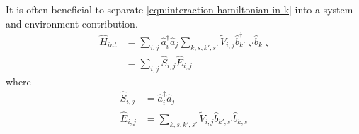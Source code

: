 It is often beneficial to separate
\cref{eqn:interaction hamiltonian in k}
into a system and environment contribution.
\begin{align}
  \hat{H}_{int} & =
  \sum_{i,j}
  \hat{a}^\dagger_{i}\hat{a}_{j}
  \sum_{k,s,k',s'}
  \tilde{V}_{i,j}
  \hat{b}^\dagger_{k',s'}\hat{b}_{k,s} \\
                & = \sum_{i,j}
  \hat{S}_{i,j} \hat{E}_{i,j}\label{eqn:split interaction hamiltonian}
\end{align}
where
\begin{align}
  \hat{S}_{i,j} & = \hat{a}^\dagger_{i}\hat{a}_{j} \\
  \hat{E}_{i,j} & = \sum_{k,s,k',s'}
  \tilde{V}_{i,j}
  \hat{b}^\dagger_{k',s'}\hat{b}_{k,s}
\end{align}